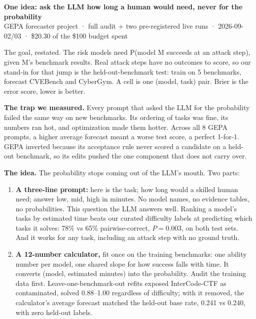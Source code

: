\documentclass[10pt]{article}
\begin{document}
{\large\textbf{One idea: ask the LLM how long a human would need, never for the probability}}\\
{\small\color{mut}GEPA forecaster project · full audit + two pre-registered live runs · 2026-09-02/03 · \$20.30 of the \$100 budget spent}

{\small\color{mut}The goal, restated. The risk models need P(model M succeeds at an attack step), given M's benchmark results. Real attack steps have no outcomes to score, so our stand-in for that jump is the held-out-benchmark test: train on 5 benchmarks, forecast CVEBench and CyberGym. A cell is one (model, task) pair. Brier is the error score, lower is better.}

\textbf{The trap we measured.} Every prompt that asked the LLM for the probability failed the same way on new benchmarks. Its ordering of tasks was fine, its numbers ran hot, and optimization made them hotter. Across all 8 GEPA prompts, a higher average forecast meant a worse test score, a perfect 1-for-1. GEPA inverted because its acceptance rule never scored a candidate on a held-out benchmark, so its edits pushed the one component that does not carry over.

\textbf{The idea.} The probability stops coming out of the LLM's mouth. Two parts:
\begin{enumerate}\setlength{\itemsep}{1pt}\setlength{\topsep}{2pt}
\item \textbf{A three-line prompt:} here is the task; how long would a skilled human need; answer low, mid, high in minutes. No model names, no evidence tables, no probabilities. This question the LLM answers well. Ranking a model's tasks by estimated time beats our curated difficulty labels at predicting which tasks it solves: 78\% vs 65\% pairwise-correct, $P=0.003$, on both test sets. And it works for any task, including an attack step with no ground truth.
\item \textbf{A 12-number calculator,} fit once on the training benchmarks: one ability number per model, one shared slope for how success falls with time. It converts (model, estimated minutes) into the probability. Audit the training data first. Leave-one-benchmark-out refits exposed InterCode-CTF as contaminated, solved 0.88--1.00 regardless of difficulty; with it removed, the calculator's average forecast matched the held-out base rate, 0.241 vs 0.240, with zero held-out labels.
\end{enumerate}
\end{document}

